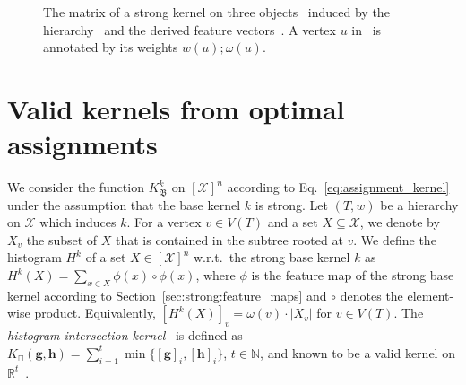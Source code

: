 \documentclass{article}
\newcommand{\X}{\ensuremath{\mathcal{X}}\xspace}
\newcommand{\bbN}[0]{\ensuremath{\mathbb{N}}\xspace}
\newcommand{\bbR}[0]{\ensuremath{\mathbb{R}}\xspace}
\newcommand{\Assign}{\ensuremath{\mathfrak{B}}\xspace}
\let\vec\mathbf
\begin{document}
\begin{figure}
  \centering
  \null\hfill
  \hfill
  \hfill
  \hfill\null
  \caption{The matrix of a strong kernel on three 
    objects~ induced by the
    hierarchy~ and the derived feature 
    vectors~. A vertex $u$ 
    in~ is annotated by its weights 
    $w(u);\omega(u)$.
  }
  \label{fig:example}
\end{figure}


\section{Valid kernels from optimal assignments}
We consider the function $K_\Assign^k$ on $[\X]^n$ according to Eq.~\eqref{eq:assignment_kernel} 
under the assumption that the base kernel $k$ is strong.
Let $(T,w)$ be a hierarchy on \X which induces $k$.
For a vertex $v \in V(T)$ and a set $X \subseteq \X$, we denote by $X_v$ the 
subset of $X$ that is contained in the subtree rooted at $v$.
We define the histogram $H^k$ of a set $X \in [\X]^n$ w.r.t.\ the strong base 
kernel $k$ as $H^k(X) = \sum_{x \in X} \phi(x) \circ \phi(x)$, where $\phi$ is 
the feature map of the strong base kernel according to 
Section~\ref{sec:strong:feature_maps} and $\circ$ denotes the element-wise 
product. Equivalently, $[H^k(X)]_v = \omega(v) \cdot |X_v|$ for $v \in V(T)$.
The \emph{histogram intersection kernel}~\cite{Swain1991} is defined as
$K_\sqcap(\vec{g},\vec{h}) = \sum_{i=1}^t \min\{[\vec{g}]_i,[\vec{h}]_i\}$,
$t \in \bbN$, and known to be a valid kernel on $\bbR^t$~\cite{Barla2003,Boughorbel2005}.
\end{document}
